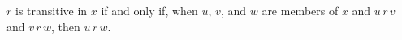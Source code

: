 $r$ is transitive in $x$ if and only if, when $u$, $v$, and $w$ are members of $x$ and $u \, r \, v$ and $v \, r \, w$, then $u \, r \, w$.
